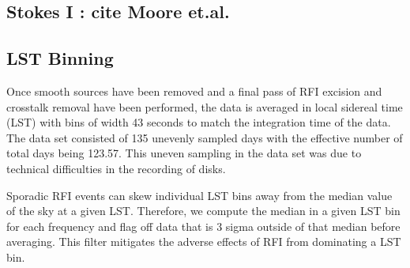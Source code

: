 \documentclass[twocolumn,numberedappendix]{emulateapj}
\begin{document}
\subsection{Stokes I : cite Moore et.al.}
\subsection{LST Binning}

Once smooth sources have been removed and a final pass of RFI excision and
crosstalk removal have been performed, the data is averaged in local sidereal
time (LST) with bins of width 43 seconds to match the integration time of the
data. The data set consisted of 135 unevenly sampled days with the effective
number of total days being 123.57. This uneven sampling in the data set was due
to technical difficulties in the recording of disks.

Sporadic RFI events can skew individual LST bins away from the median value of
the sky at a given LST. Therefore, we compute the median in a given LST bin for
each frequency and flag off data that is 3 sigma outside of that median before
averaging. This filter mitigates the adverse effects of RFI from dominating a
LST bin. 
\end{document}
